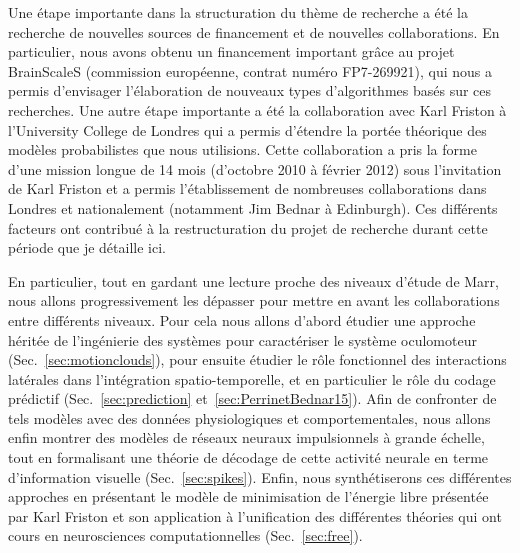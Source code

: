 Une étape importante dans la structuration du thème de recherche a été la recherche de nouvelles sources de financement et de nouvelles collaborations. En particulier, nous avons obtenu un financement important grâce au projet BrainScaleS (commission européenne, contrat numéro FP7-269921), qui nous a permis d'envisager l'élaboration de nouveaux types d'algorithmes basés sur ces recherches. Une autre étape importante a été la collaboration avec Karl Friston à l'University College de Londres qui a permis d'étendre la portée théorique des modèles probabilistes que nous utilisions. Cette collaboration a pris la forme d'une mission longue de 14 mois (d'octobre 2010 à février 2012) sous l'invitation de Karl Friston et a permis l'établissement de nombreuses collaborations dans Londres et nationalement (notamment Jim Bednar à Edinburgh). Ces différents facteurs ont contribué à la restructuration du projet de recherche durant cette période que je détaille ici.%

En particulier, tout en gardant une lecture proche des niveaux d'étude de Marr, nous allons progressivement les dépasser pour mettre en avant les collaborations entre différents niveaux. Pour cela nous allons d'abord étudier une approche héritée de l'ingénierie des systèmes pour caractériser le système oculomoteur (Sec.~\ref{sec:motionclouds}), pour ensuite étudier le rôle fonctionnel des interactions latérales dans l'intégration spatio-temporelle, et en particulier le rôle du codage prédictif (Sec.~\ref{sec:prediction} et~\ref{sec:PerrinetBednar15}). Afin de confronter de tels modèles avec des données physiologiques et comportementales, nous allons enfin montrer des modèles de réseaux neuraux impulsionnels à grande échelle, tout en formalisant une théorie de décodage de cette activité neurale en terme d'information visuelle (Sec.~\ref{sec:spikes}). Enfin, nous synthétiserons ces différentes approches en présentant le modèle de minimisation de l'énergie libre présentée par Karl Friston et son application à l'unification des différentes théories qui ont cours en neurosciences computationnelles (Sec.~\ref{sec:free}).

